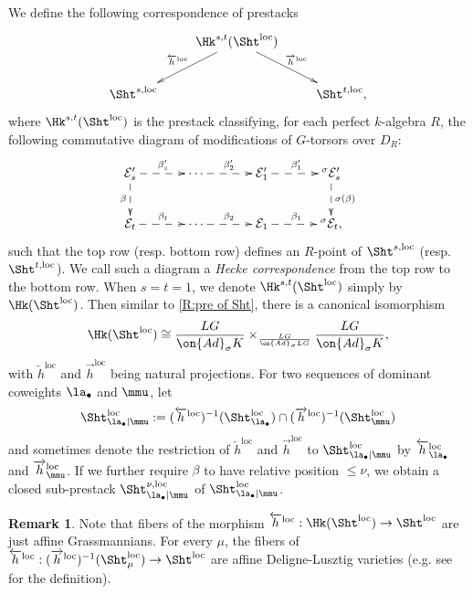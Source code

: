 \documentclass[11pt]{amsart}
\theoremstyle{definition}
\theoremstyle{definition}
\newtheorem{rmk}[thm]{Remark}
\theoremstyle{definition}
\numberwithin{equation}{subsection}
\def\calE{\mathcal{E}}
\newcommand{\mE}{{\mathcal E}}
\newcommand{\Ad}{{\on{Ad}}}
\newcommand{\loc}{\mathrm{loc}}
\begin{document}
We define the following correspondence of prestacks 
\begin{equation}
\label{E;Hk Shtuka}
\xymatrix{&\Hk^{s,t}(\Sht^\loc)\ar_{\overleftarrow{h}^\loc}[dl]\ar^{\overrightarrow{h}^\loc}[dr]&\\
\Sht^{s,\loc}&&\Sht^{t,\loc},
}
\end{equation}
where $\Hk^{s,t}(\Sht^\loc)$ is the prestack classifying, for each perfect $k$-algebra $R$, the following commutative diagram of modifications of $G$-torsors over $D_R$:
\begin{equation*}\label{qi for diff type}
\xymatrix@C=35pt{
\mE'_s \ar@{-->}[r]^{\beta'_s} \ar@{-->}[d]_\beta & \cdots  \ar@{-->}[r]^{\beta'_2} & \calE'_1 \ar@{-->}[r]^{\beta'_1} & {}^\sigma\mE'_s \ar@{-->}[d]^{\sigma(\beta)}\\
\mE_t \ar@{-->}[r]^{\beta_t} & \cdots  \ar@{-->}[r]^{\beta_2} & \calE_1 \ar@{-->}[r]^{\beta_1} & {}^\sigma\mE_t,
}
\end{equation*}
such that the top row (resp. bottom row) defines an $R$-point of $\Sht^{s,\loc}$ (resp. $\Sht^{t,\loc}$).
We call such a diagram a \emph{Hecke correspondence} from the top row to the bottom row. When $s=t=1$, we denote $\Hk^{s,t}(\Sht^\loc)$ simply by $\Hk(\Sht^\loc)$.
Then similar to \eqref{R:pre of Sht}, there is a canonical isomorphism 
$$\Hk(\Sht^\loc)\cong \frac{LG}{\Ad_\sigma K}\times_{\frac{LG}{\Ad_\sigma LG}} \frac{LG}{\Ad_\sigma K},$$
with $\overleftarrow{h}^\loc$ and $\overrightarrow{h}^\loc$ being natural projections.
For two sequences of dominant coweights $\la_\bullet$ and $\mmu$, let 
\[\Sht^{\loc}_{\la_\bullet\mid\mmu}:=(\overleftarrow{h}^\loc)^{-1}(\Sht^\loc_{\la_\bullet})\cap (\overrightarrow{h}^\loc)^{-1}(\Sht^\loc_{\mmu})\]
and sometimes denote the restriction of $\overleftarrow{h}^\loc$ and $\overrightarrow{h}^\loc$ to $\Sht^{\loc}_{\la_\bullet\mid\mmu}$ by $\overleftarrow{h}^\loc_{\la_\bullet}$ and $\overrightarrow{h}^\loc_\mmu$.
If we further require $\beta$ to have relative position $\leq \nu$, we obtain a closed sub-prestack $\Sht_{\la_\bullet|\mmu}^{\nu,\loc}$ of $\Sht_{\la_\bullet|\mmu}^{\loc}$. 


\begin{rmk}
\label{R:fiber of hloc}
Note that fibers of the morphism $\overleftarrow{h}^\loc: \Hk(\Sht^\loc)\to\Sht^\loc$ are just affine Grassmannians. For every $\mu$, the fibers
of $\overleftarrow{h}^\loc: (\overrightarrow{h}^\loc)^{-1}(\Sht^{\loc}_\mu)\to \Sht^\loc$ are affine Deligne-Lusztig varieties (e.g. see \cite[\S 3.1]{Zh1} for the definition).
\end{rmk}
\end{document}
